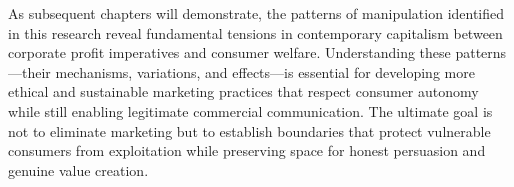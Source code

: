 As subsequent chapters will demonstrate, the patterns of manipulation identified in this research reveal fundamental tensions in contemporary capitalism between corporate profit imperatives and consumer welfare. Understanding these patterns—their mechanisms, variations, and effects—is essential for developing more ethical and sustainable marketing practices that respect consumer autonomy while still enabling legitimate commercial communication. The ultimate goal is not to eliminate marketing but to establish boundaries that protect vulnerable consumers from exploitation while preserving space for honest persuasion and genuine value creation.